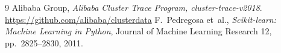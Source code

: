 \documentclass[10pt,a4paper]{article}
\begin{document}
\begin{thebibliography}{9}\small
{} Alibaba Group, \emph{Alibaba Cluster Trace Program, cluster-trace-v2018}.
  \url{https://github.com/alibaba/clusterdata}
 F.~Pedregosa et~al., \emph{Scikit-learn: Machine Learning in Python},
  Journal of Machine Learning Research 12, pp.~2825--2830, 2011.
\end{thebibliography}
\end{document}
